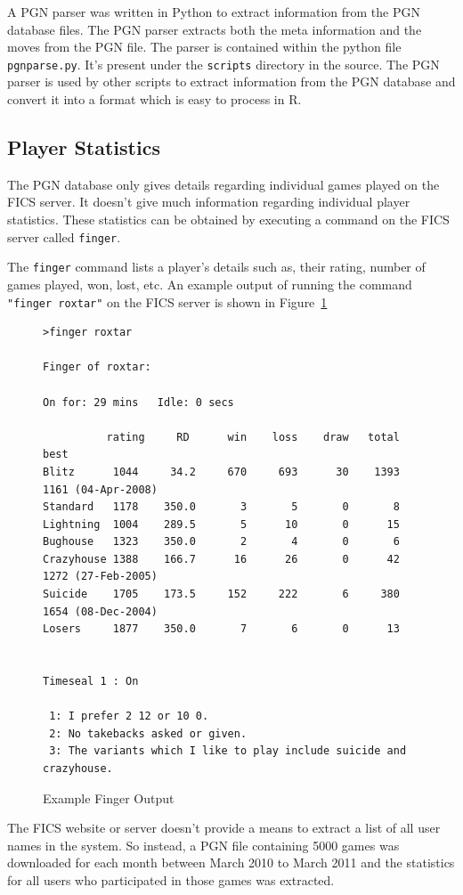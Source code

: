 \documentclass{article}
\begin{document}
A PGN parser was written in Python to extract information from the PGN database files. The PGN parser extracts both the meta information and the moves from the PGN file. The parser is contained within the python file \verb=pgnparse.py=. It's present under the \verb=scripts= directory in the source. The PGN parser is used by other scripts to extract information from the PGN database and convert it into a format which is easy to process in R.

\subsection{Player Statistics}
\label{sec:pstats}
The PGN database only gives details regarding individual games played on the FICS server. It doesn't give much information regarding individual player statistics. These statistics can be  obtained  by executing a command on the FICS server called \verb=finger=. 

The \verb=finger= command lists a player's details such as, their rating, number of games played, won, lost, etc. An example output of running the command \verb="finger roxtar"= on the FICS server is shown in Figure~\ref{fig:finger}

\begin{figure}[htp]
\begin{verbatim}
>finger roxtar

Finger of roxtar:

On for: 29 mins   Idle: 0 secs

          rating     RD      win    loss    draw   total   best
Blitz      1044     34.2     670     693      30    1393   1161 (04-Apr-2008)
Standard   1178    350.0       3       5       0       8
Lightning  1004    289.5       5      10       0      15
Bughouse   1323    350.0       2       4       0       6
Crazyhouse 1388    166.7      16      26       0      42   1272 (27-Feb-2005)
Suicide    1705    173.5     152     222       6     380   1654 (08-Dec-2004)
Losers     1877    350.0       7       6       0      13


Timeseal 1 : On

 1: I prefer 2 12 or 10 0.
 2: No takebacks asked or given.
 3: The variants which I like to play include suicide and crazyhouse.
\end{verbatim}
\caption{Example Finger Output}
\label{fig:finger}
\end{figure}

\pagebreak

The FICS website or server doesn't provide a means to extract a list of all user names in the system. So instead, a PGN file containing 5000 games was downloaded for each month between March 2010 to March 2011 and the statistics for all users who participated in those games was extracted. 
\end{document}
